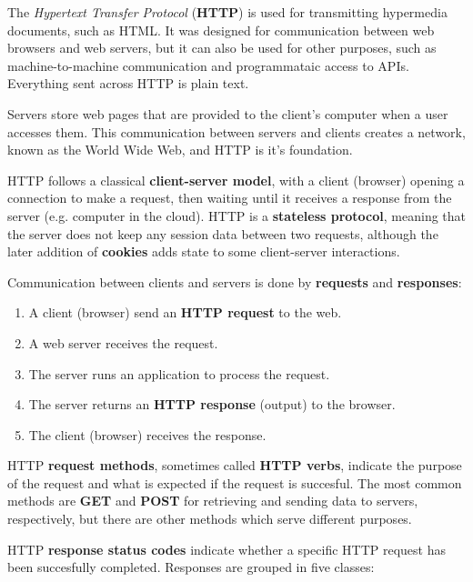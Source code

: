 The \textit{Hypertext Transfer Protocol} (\textbf{HTTP}) is used for transmitting hypermedia documents, such as HTML. It was designed for communication between web browsers and web servers, but it can also be used for other purposes, such as machine-to-machine communication and programmataic access to APIs. Everything sent across HTTP is plain text.

Servers store web pages that are provided to the client's computer when a user accesses them. This communication between servers and clients creates a network, known as the World Wide Web, and HTTP is it's foundation.

HTTP follows a classical \textbf{client-server model}, with a client (browser) opening a connection to make a request, then waiting until it receives a response from the server (e.g. computer in the cloud). HTTP is a \textbf{stateless protocol}, meaning that the server does not keep any session data between two requests, although the later addition of \textbf{cookies} adds state to some client-server interactions.

Communication between clients and servers is done by \textbf{requests} and \textbf{responses}:

\begin{enumerate}
  \item A client (browser) send an \textbf{HTTP request} to the web.
  \item A web server receives the request.
  \item The server runs an application to process the request.
  \item The server returns an \textbf{HTTP response} (output) to the browser.
  \item The client (browser) receives the response.
\end{enumerate}

HTTP \textbf{request methods}, sometimes called \textbf{HTTP verbs}, indicate the purpose of the request and what is expected if the request is succesful. The most common methods are \textbf{GET} and \textbf{POST} for retrieving and sending data to servers, respectively, but there are other methods which serve different purposes.

HTTP \textbf{response status codes} indicate whether a specific HTTP request has been succesfully completed. Responses are grouped in five classes:

